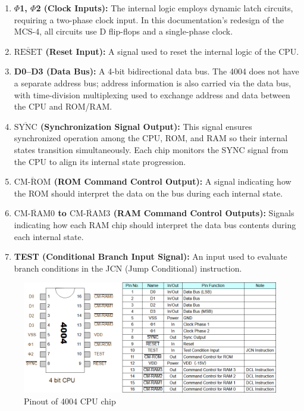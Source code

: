 \begin{enumerate}[\textbf{(\arabic*)}]
  \item \textbf{$\Phi$1, $\Phi$2 (Clock Inputs):}  
    The internal logic employs dynamic latch circuits, requiring a two-phase clock input. In this documentation’s redesign of the MCS-4, all circuits use D flip-flops and a single-phase clock.

  \item \textbf{$\overline{\text{RESET}}$ (Reset Input):} 
    A signal used to reset the internal logic of the CPU.

  \item \textbf{D0--D3 (Data Bus):} 
    A 4-bit bidirectional data bus. The 4004 does not have a separate address bus; address information is also carried via the data bus, with time-division multiplexing used to exchange address and data between the CPU and ROM/RAM.

  \item \textbf{$\overline{\text{SYNC}}$ (Synchronization Signal Output):}  
    This signal ensures synchronized operation among the CPU, ROM, and RAM so their internal states transition simultaneously. Each chip monitors the SYNC signal from the CPU to align its internal state progression.

  \item \textbf{$\overline{\text{CM-ROM}}$ (ROM Command Control Output):}  
    A signal indicating how the ROM should interpret the data on the bus during each internal state.

  \item \textbf{$\overline{\text{CM-RAM0}}$ to $\overline{\text{CM-RAM3}}$ (RAM Command Control Outputs):}  
    Signals indicating how each RAM chip should interpret the data bus contents during each internal state.

  \item \textbf{TEST (Conditional Branch Input Signal):}  
    An input used to evaluate branch conditions in the JCN (Jump Conditional) instruction.
\end{enumerate}

\begin{figure}
    \includegraphics[width=1.0\columnwidth]{./Figure/Pinout4004.png}
    \caption{Pinout of 4004 CPU chip}
    \label{fig:PINOUT4004}
\end{figure}

